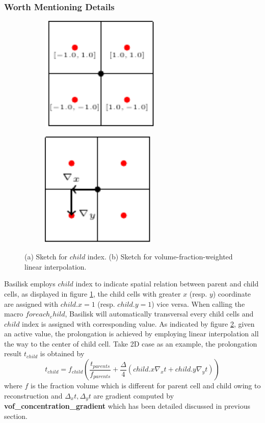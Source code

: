 \documentclass[a4paper]{article}
\newcommand{\func}[1]{\textbf{\textcolor{function}{#1}}}
\begin{document}
\subsubsection{Worth Mentioning Details}
\begin{figure}
    \centering
    \begin{subfigure}[b]{0.45\textwidth}
        \centering
        \includegraphics[height=5.5cm]{image/child.pdf}
        \subcaption{}
        \label{fig:child_a}
    \end{subfigure}
    \begin{subfigure}[b]{0.45\textwidth}
        \centering
        \includegraphics[height=5.5cm]{image/childgradient.pdf}
        \subcaption{}
        \label{fig:child_b}
    \end{subfigure}
    \caption{(a) Sketch for $child$ index. (b) Sketch for volume-fraction-weighted linear interpolation.}
    \label{fig:child}
\end{figure}
Basilisk employs $child$ index to indicate spatial relation between parent and child cells, as displayed in figure \ref{fig:child_a}, the child cells with greater $x$ (resp. $y$) coordinate are assigned with $child.x = 1$ (resp. $child.y = 1$) vice versa. When calling the macro $foreach_child$, Basilisk will automatically transversal every child cells and $child$ index is assigned with corresponding value. As indicated by figure \ref{fig:child_b}, given an active value, the prolongation is achieved by employing linear interpolation all the way to the center of child cell. Take 2D case as an example, the prolongation result $t_{child}$ is obtained by 
\begin{equation}
    t_{child} = f_{child}(\frac{t_{parents}}{f_{parents}} + \frac{\Delta}{4}(child.x\nabla_xt+child.y\nabla_yt))
\end{equation}
where $f$ is the fraction volume which is different for parent cell and child owing to reconstruction and $\Delta_xt,\Delta_yt$ are gradient computed by \func{vof\_concentration\_gradient} which has been detailed discussed in previous section.
\end{document}
